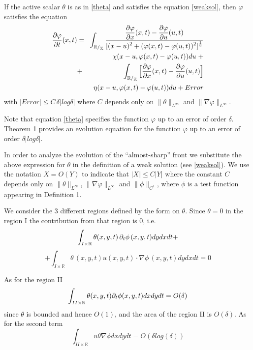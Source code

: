 \documentclass{pnastwo}
\begin{document}
\begin{article}
\begin{theorem}
If the active scalar $\theta$ is as in \eqref{theta} and satisfies
the equation \eqref{weaksol}, then $\varphi$ satisfies the
equation
\begin{eqnarray}
\mfrac{\pr \varphi}{\pr t}(x,t)&=&\hspace{-2pt}\dst
\int_{\fd}\mfrac{\mfrac{\pr \varphi}{\pr x}(x,t)-\mfrac{\pr
\varphi}{\pr
u}(u,t)}{[(x-u)^{2}+(\varphi(x,t)-\varphi(u,t))^{2}]^{\f12}}\nonumber\\
&&
\chi(x-u,\varphi(x,t)-\varphi(u,t)) du \hspace{3pt} +
\nonumber\\
&+&\dst \int_{\fd} \Big{[}\mfrac{\pr \varphi} {\pr
x}(x,t)-\mfrac{\pr \varphi}{\pr u} (u,t)\Big{]}
\nonumber\\&&
\eta(x-u,\varphi(x,t)-\varphi(u,t)) du + Error
\end{eqnarray}
with $|Error|\leq C\, \delta | log\delta| $ where $C$ depends only
on $\|\theta\|_{L^{\infty}}$ and $\|
\nabla\varphi\|_{L^{\infty}}$.
\end{theorem}

\begin{remark}
Note that equation \eqref{theta} specifies  the function $\varphi$
up to an error of order $\delta$. Theorem 1 provides an evolution
equation for the function $\varphi$ up to an error of order
$\delta |log \delta|$.
\end{remark}

In order to analyze the evolution of the ``almost-sharp'' front we
substitute the above expression for $\theta$ in the definition of
a weak solution (see \eqref{weaksol}). We use the notation $X =O(
Y)$ to indicate that $|X|\leq C |Y|$ where the constant $C$
depends only on $\|\theta\|_{L^{\infty}}$, $\|
\nabla\varphi\|_{L^{\infty}}$ and $\|\phi\|_{C^1}$, where $\phi$
is a test function appearing in Definition 1.

We consider the 3 different regions defined by the form on
$\theta$. Since $\theta=0$ in the region I the contribution from
that region is 0, i.e.
\[
  \int_{I\times \mathbb{R}}
 \theta(x,y,t)\, \partial_t \phi
\,(x,y,t) dy dx dt+  \]
\[
   +\int_{I\times \mathbb{R}}
 \theta\,(x,y,t) u(x,y,t)\cdot\nabla\phi\,(x,y,t) dydxdt = 0
\]

As for the region II
\[
\int_{II\times \mathbb{R}} \theta (x,y,t) \partial_t\phi (x,y,t)dx dy
dt = O(\delta)
\]
since $\theta$ is bounded and hence $O(1)$, and the area of the
region II is $O(\delta)$. As for the second term
\[
\int_{II\times \mathbb{R}} u \theta \nabla \phi dx dy dt =
O(\delta log(\delta))
\]


\end{article}
\end{document}
